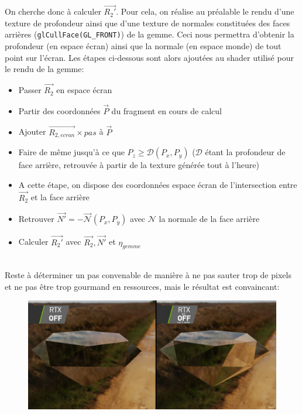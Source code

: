 \documentclass[a4paper,12pt]{article}
\begin{document}
On cherche donc à calculer $\overrightarrow{R_2'}$. Pour cela, on réalise au préalable le rendu d'une texture de profondeur ainsi
que d'une texture de normales constituées des faces arrières (\texttt{glCullFace(GL\_FRONT)}) de la gemme. Ceci nous permettra d'obtenir
la profondeur (en espace écran) ainsi que la normale (en espace monde) de tout point sur l'écran. Les étapes ci-dessous sont alors ajoutées
au shader utilisé pour le rendu de la gemme:
\begin{itemize}
    \item Passer $\overrightarrow{R_2}$ en espace écran
    \item Partir des coordonnées $\overrightarrow{P}$ du fragment en cours de calcul
    \item Ajouter $\overrightarrow{R_{2,ecran}}\times pas$ à $\overrightarrow{P}$
    \item Faire de même jusqu'à ce que $P_z \geq \mathcal{D}(P_x, P_y)$ ($\mathcal{D}$ étant la profondeur de face arrière, retrouvée à partir de la texture générée tout à l'heure)
    \item A cette étape, on dispose des coordonnées espace écran de l'intersection entre $\overrightarrow{R_2}$ et la face arrière
    \item Retrouver $\overrightarrow{N'} = -\overrightarrow{\mathcal{N}}(P_x, P_y)$ avec $\mathcal{N}$ la normale de la face arrière
    \item Calculer $\overrightarrow{R_2'}$ avec $\overrightarrow{R_2}, \overrightarrow{N'}$ et $\eta_{gemme}$
\end{itemize}

\ \\
Reste à déterminer un pas convenable de manière à ne pas sauter trop de pixels et ne pas être
trop gourmand en ressources, mais le résultat est convaincant:
\begin{figure}[H]
    \centering
    \includegraphics[width=14cm]{intref_cmp.jpg}
\end{figure}
\end{document}
